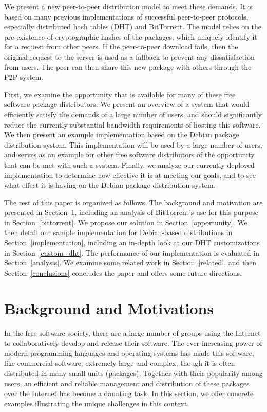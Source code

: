 \documentclass[conference]{IEEEtran}
\begin{document}
We present a new peer-to-peer distribution model to meet these
demands. It is based on many previous implementations of successful
peer-to-peer protocols, especially distributed hash tables (DHT) and
BitTorrent. The model relies on the pre-existence of cryptographic
hashes of the packages, which uniquely identify it for a
request from other peers. If the peer-to-peer download fails, then
the original request to the server is used as a fallback to prevent
any dissatisfaction from users. The peer can then share this new
package with others through the P2P system.

First, we examine the opportunity that is available for many of
these free software package distributors. We present an overview of
a system that would efficiently satisfy the demands of a large
number of users, and should significantly reduce the currently
substantial bandwidth requirements of hosting this software. We then
present an example implementation based on the Debian package
distribution system. This implementation will be used by a large
number of users, and serves as an example for other free software
distributors of the opportunity that can be met with such a system.
Finally, we analyze our currently deployed implementation to
determine how effective it is at meeting our goals, and to see what
effect it is having on the Debian package distribution system.

The rest of this paper is organized as follows. The background and motivation are presented in Section~\ref{situation}, including an analysis of BitTorrent's use for this purpose in Section~\ref{bittorrent}. We propose
our solution in Section~\ref{opportunity}. We then detail our sample
implementation for Debian-based distributions in Section~\ref{implementation},
including an in-depth look at our DHT
customizations in Section~\ref{custom_dht}. The performance of our implementation is evaluated in Section~\ref{analysis}. We examine some related work in Section~\ref{related}, and then
Section~\ref{conclusions} concludes the paper and offers some future directions.


\section{Background and Motivations}
\label{situation}

In the free software society, there are a large number of groups using the Internet to 
collaboratively develop and release their software. The ever increasing power of
modern programming languages and operating systems has made this software, like commercial software, extremely large and complex, though it is often
distributed in many small units (packages). Together with their popularity among users, 
an efficient and reliable management and distribution of these packages over the Internet has become a daunting task. In this section, we offer concrete examples illustrating the 
unique challenges in this context. 
\end{document}
